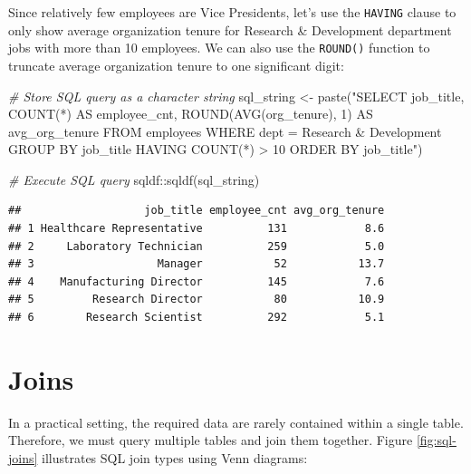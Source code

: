 \documentclass[
]{book}
\newenvironment{Shaded}{\begin{snugshade}}{\end{snugshade}}
\newcommand{\CommentTok}[1]{\textcolor[rgb]{0.56,0.35,0.01}{\textit{#1}}}
\newcommand{\FunctionTok}[1]{\textcolor[rgb]{0.00,0.00,0.00}{#1}}
\newcommand{\NormalTok}[1]{#1}
\newcommand{\OtherTok}[1]{\textcolor[rgb]{0.56,0.35,0.01}{#1}}
\newcommand{\SpecialCharTok}[1]{\textcolor[rgb]{0.00,0.00,0.00}{#1}}
\newcommand{\StringTok}[1]{\textcolor[rgb]{0.31,0.60,0.02}{#1}}
\begin{document}
Since relatively few employees are Vice Presidents, let's use the \texttt{HAVING} clause to only show average organization tenure for Research \& Development department jobs with more than 10 employees. We can also use the \texttt{ROUND()} function to truncate average organization tenure to one significant digit:

\begin{Shaded}
\begin{Highlighting}[]
\CommentTok{\# Store SQL query as a character string}
\NormalTok{sql\_string }\OtherTok{\textless{}{-}} \FunctionTok{paste}\NormalTok{(}\StringTok{"SELECT}
\StringTok{                      job\_title,}
\StringTok{                      COUNT(*) AS employee\_cnt,}
\StringTok{                      ROUND(AVG(org\_tenure), 1) AS avg\_org\_tenure}
\StringTok{                    FROM}
\StringTok{                      employees}
\StringTok{                    WHERE}
\StringTok{                      dept = \textquotesingle{}Research \& Development\textquotesingle{}}
\StringTok{                    GROUP BY}
\StringTok{                      job\_title}
\StringTok{                    HAVING}
\StringTok{                      COUNT(*) \textgreater{} 10}
\StringTok{                    ORDER BY}
\StringTok{                      job\_title"}\NormalTok{)}

\CommentTok{\# Execute SQL query}
\NormalTok{sqldf}\SpecialCharTok{::}\FunctionTok{sqldf}\NormalTok{(sql\_string)}
\end{Highlighting}
\end{Shaded}

\begin{verbatim}
##                   job_title employee_cnt avg_org_tenure
## 1 Healthcare Representative          131            8.6
## 2     Laboratory Technician          259            5.0
## 3                   Manager           52           13.7
## 4    Manufacturing Director          145            7.6
## 5         Research Director           80           10.9
## 6        Research Scientist          292            5.1
\end{verbatim}

\hypertarget{joins}{%
\section{Joins}\label{joins}}

In a practical setting, the required data are rarely contained within a single table. Therefore, we must query multiple tables and join them together. Figure \ref{fig:sql-joins} illustrates SQL join types using Venn diagrams:
\end{document}
